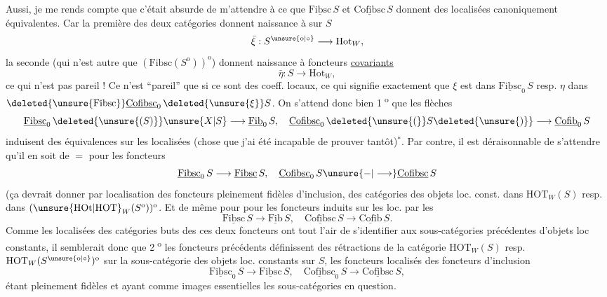 Aussi, je me rends compte que c'était absurde de m'attendre à ce que $\underline{\mathrm{Fibsc}}\,S$ et $\underline{\mathrm{Cofibsc}}\,S$ donnent des  localisées canoniquement équivalentes. Car  la première
des deux catégories donnent naissance  à    sur $S$
\[
 \bar{\xi}:S^{\unsure{\mathrm o|\circ}}\longrightarrow\mathrm{Hot}_W,
\]
 la seconde (qui n'est autre que $(\mathrm{Fibsc}(S^{\mathrm o}))^{\mathrm o}$) donnent naissance  à  foncteurs \uline{covariants}
\[
 \bar{\eta}:S\longrightarrow\mathrm{Hot}_W,
\]
ce qui n'est pas pareil ! Ce n'est ``pareil'' que si ce sont des coeff. locaux, ce qui signifie exactement que $\xi$ est dans $\underline{\mathrm{Fibsc}}_0\,S$ resp. $\eta$ dans $\deleted{\unsure{\mathrm{Fibsc}}}\underline{\mathrm{Cofibsc}}_0\,\deleted{\unsure{\xi}}S$. On s'attend donc bien \textcircled{\scriptsize 1\textsuperscript{o}} que les flèches
\[
 \underline{\mathrm{Fibsc}}_0\,\deleted{\unsure{(S)}}\unsure{X|S}\longrightarrow\underline{\mathrm{Fib}}_0\,S,\quad
 \underline{\mathrm{Cofibsc}}_0\,\deleted{\unsure{(}}S\deleted{\unsure{)}}\longrightarrow\underline{\mathrm{Cofib}}_0\,S
\]
induisent des équivalences sur les localisées (chose que j'ai été incapable de prouver tantôt)$^{*}$. 
Par contre, il est  déraisonnable de s'attendre  qu'il en soit de $=$ pour les foncteurs
\[
 \underline{\mathrm{Fibsc}}_0\,S\longrightarrow\underline{\mathrm{Fibsc}}\,S,\quad
 \underline{\mathrm{Cofibsc}}_0\,S\unsure{\mathord{-}|\longrightarrow}\underline{\mathrm{Cofibsc}}\,S
\]
(ça devrait donner par localisation des foncteurs pleinement fidèles d'inclusion, des catégories des objets loc. const. dans $\mathrm{HOT}_W(S)$ resp. dans $(\unsure{\mathrm{HOt}|\mathrm{HOT}}_W(S^{\mathrm o}))^{\mathrm o}$. Et de même pour
pour les foncteurs induits sur les loc. par les
\[
 \underline{\mathrm{Fibsc}}\,S\longrightarrow\underline{\mathrm{Fib}}\,S,\quad
 \underline{\mathrm{Cofibsc}}\,S\longrightarrow\underline{\mathrm{Cofib}}\,S.
\]
Comme les localisées des catégories buts des ces deux foncteurs ont tout l'air de s'identifier aux sous-catégories précédentes d'objets loc constants, il semblerait donc que \textcircled{\scriptsize 2\textsuperscript{o}} les foncteurs précédents définissent
des rétractions de la catégorie $\mathrm{HOT}_W(S)$ resp. $\mathrm{HOT}_W(S^{\unsure{\mathrm o|\circ}})^{\mathrm o}$ sur la sous-catégorie des objets loc. constants sur $S$, les foncteurs localisés des foncteurs d'inclusion
\[
 \underline{\mathrm{Fibsc}}_0\,S\longrightarrow\underline{\mathrm{Fibsc}}\,S,\quad
 \underline{\mathrm{Cofibsc}}_0\,S\longrightarrow\underline{\mathrm{Cofibsc}}\,S,
\]
étant pleinement fidèles et ayant comme images essentielles les sous-catégories en question.

